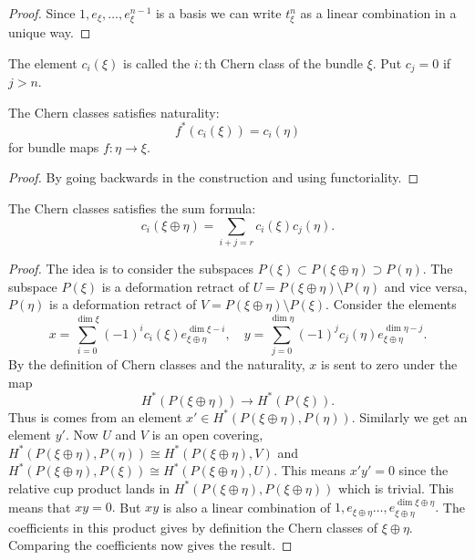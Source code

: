 \documentclass[a4paper,openany]{scrbook}
\begin{document}
\begin{proof}
Since $1,e_\xi,\dots,e_\xi^{n-1}$ is a basis we can write $t_\xi^n$ as a linear combination in a unique way.
\end{proof}

\begin{defn}
The element $c_i(\xi)$ is called the $i:$th Chern class of the bundle $\xi.$ Put $c_j=0$ if $j>n.$
\end{defn}

\begin{lemma}\label{lemma:chernnatural}
The Chern classes satisfies naturality: $$f^*(c_i(\xi))=c_i(\eta)$$ for bundle maps $f:\eta \rightarrow \xi.$
\end{lemma}

\begin{proof}
By going backwards in the construction and using functoriality.
\end{proof}

\begin{lemma} \label{lemma:chernsumformula}
The Chern classes satisfies the sum formula:
$$c_i(\xi\oplus\eta)=\sum_{i+j=r}c_i(\xi)c_j(\eta).$$
\end{lemma}

\begin{proof}
The idea is to consider the subspaces $P(\xi)\subset P(\xi\oplus\eta) \supset P(\eta).$ The subspace $P(\xi)$ is a deformation retract of $U=P(\xi\oplus\eta)\setminus P(\eta)$ and vice versa, $P(\eta)$ is a deformation retract of $V=P(\xi\oplus\eta)\setminus P(\xi).$ Consider the elements $$x=\sum_{i=0}^{\dim \xi}(-1)^ic_i(\xi)e_{\xi\oplus\eta}^{\dim \xi -i},\quad y=\sum_{j=0}^{\dim \eta}(-1)^jc_j(\eta)e_{\xi\oplus\eta}^{\dim \eta -j}.$$ By the definition of Chern classes and the naturality, $x$ is sent to zero under the map $$H^*(P(\xi\oplus\eta))\rightarrow H^*(P(\xi)).$$ Thus is comes from an element $x' \in H^*(P(\xi\oplus\eta),P(\eta)).$ Similarly we get an element $y'.$ Now $U$ and $V$ is an open covering, $H^*(P(\xi\oplus\eta),P(\eta))\cong H^*(P(\xi\oplus\eta),V)$ and $H^*(P(\xi\oplus\eta),P(\xi))\cong H^*(P(\xi\oplus\eta),U).$ This means $x'y'=0$ since the relative cup product lands in $H^*(P(\xi\oplus\eta),P(\xi\oplus\eta))$ which is trivial. This means that $xy=0.$ But $xy$ is also a linear combination of $1,e_{\xi\oplus\eta}\dots, e_{\xi\oplus\eta}^{\dim \xi\oplus\eta}.$ The coefficients in this product gives by definition the Chern classes of $\xi\oplus\eta.$ Comparing the coefficients now gives the result.
\end{proof}
\end{document}

